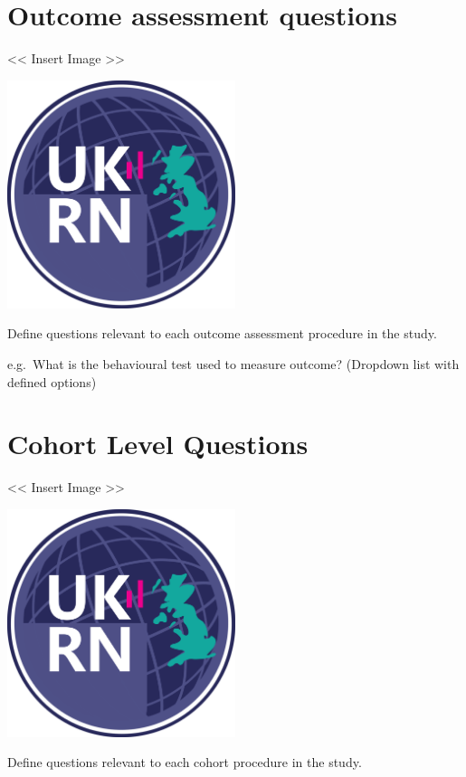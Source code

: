 \documentclass[]{book}
\begin{document}
\section{Outcome assessment
questions}\label{outcome-assessment-questions}

\textless{}\textless{} Insert Image \textgreater{}\textgreater{}

\includegraphics[width=0.50000\textwidth,height=0.50000\textwidth]{figs/evidence-triangle.png}

Define questions relevant to each outcome assessment procedure in the
study.

e.g.~What is the behavioural test used to measure outcome? (Dropdown
list with defined options)

\section{Cohort Level Questions}\label{cohort-level-questions}

\textless{}\textless{} Insert Image \textgreater{}\textgreater{}

\includegraphics[width=0.50000\textwidth,height=0.50000\textwidth]{figs/evidence-triangle.png}

Define questions relevant to each cohort procedure in the study.
\end{document}

